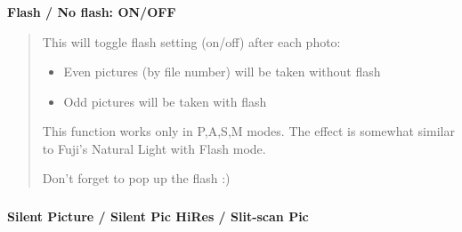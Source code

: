 \documentclass[a4paper,english]{article}
\begin{document}
\vspace{-10mm}\subsubsection*{}\label{flash-no-flash}
\textbf{Flash / No flash: ON/OFF}
%
\begin{quote}

This will toggle flash setting (on/off) after each photo:
%
\begin{itemize}

\item Even pictures (by file number) will be taken without flash

\item Odd pictures will be taken with flash

\end{itemize}

This function works only in P,A,S,M modes. The effect is somewhat similar to Fuji's Natural Light with Flash mode.

Don't forget to pop up the flash :)

\end{quote}
\vspace{-10mm}\subsubsection*{}\label{silent-pictures}\vspace{-10mm}\subsubsection*{}\label{slit-scan-pictures}
\textbf{Silent Picture / Silent Pic HiRes / Slit-scan Pic}
%
\end{document}
